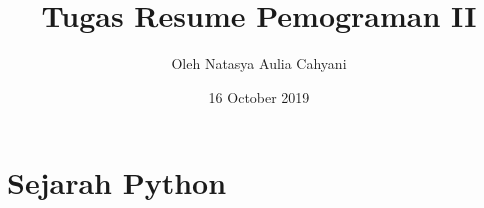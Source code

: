 \documentclass{article}
\title{Tugas Resume Pemograman II}
\author{ Oleh Natasya Aulia Cahyani }
\date{16 October 2019}
\begin{document}
\maketitle

\section{Sejarah Python}

\usepackage{Python dikembangkan oleh Guido van Rossum pada tahun 1990 di CWI, Amsterdam sebagai kelanjutan dari bahasa pemrograman ABC. Versi terakhir yang dikeluarkan CWI adalah 1.2.}

\usepackage{Tahun 1995, Guido pindah ke CNRI sambil terus melanjutkan pengembangan Python. Versi terakhir yang dikeluarkan adalah 1.6. Tahun 2000, Guido dan para pengembang inti Python pindah ke BeOpen.com yang merupakan sebuah perusahaan komersial dan membentuk BeOpen PythonLabs. Python 2.0 dikeluarkan oleh BeOpen. Setelah mengeluarkan Python 2.0, Guido dan beberapa anggota tim PythonLabs pindah ke DigitalCreations.}

\usepackage{Saat ini pengembangan Python terus dilakukan oleh sekumpulan pemrogram yang dikoordinir Guido dan Python Software Foundation. Python Software Foundation adalah sebuah organisasi non-profit yang dibentuk sebagai pemegang hak cipta intelektual Python sejak versi 2.1 dan dengan demikian mencegah Python dimiliki oleh perusahaan komersial. Saat ini distribusi Python sudah mencapai versi 2.6.1 dan versi 3.0.
Nama Python dipilih oleh Guido sebagai nama bahasa ciptaannya karena kecintaan guido pada acara televisi Monty Python s Flying Circus. Oleh karena itu seringkali ungkapan-ungkapan khas dari acara tersebut seringkali muncul dalam korespondensi antar pengguna Python.}
\end{document}
